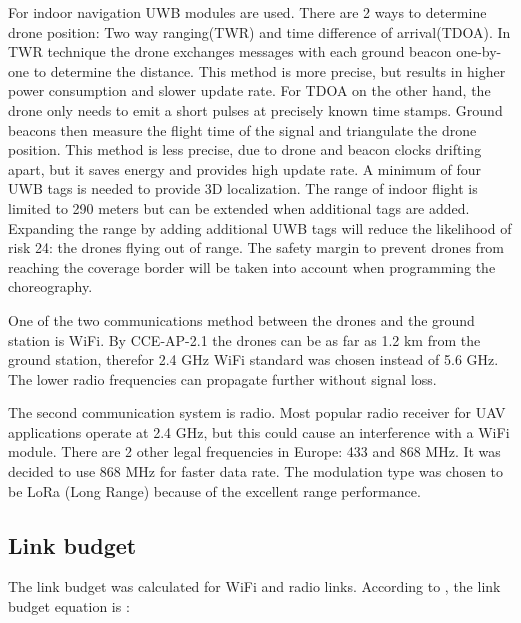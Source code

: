 For indoor navigation UWB modules are used. There are 2 ways to determine drone position: Two way ranging(TWR) and time difference of arrival(TDOA). In TWR technique the drone exchanges messages with each ground beacon one-by-one to determine the distance. This method is more precise, but results in higher power consumption and slower update rate. For TDOA on the other hand, the drone only needs to emit a short pulses at precisely known time stamps. Ground beacons then measure the flight time of the signal and triangulate the drone position. This method is less precise, due to drone and beacon clocks drifting apart, but it saves energy and provides high update rate. A minimum of four UWB tags is needed to provide 3D localization. The range of indoor flight is limited to 290 meters\cite{UWBrange} but can be extended when additional tags are added. Expanding the range by adding additional UWB tags will reduce the likelihood of risk 24: the drones flying out of range. The safety margin to prevent drones from reaching the coverage border will be taken into account when programming the choreography.

One of the two communications method between the drones and the ground station is WiFi. By CCE-AP-2.1 the drones can be as far as 1.2 km from the ground station, therefor 2.4 GHz WiFi standard was chosen instead of 5.6 GHz. The lower radio frequencies can propagate further without signal loss.

The second communication system is radio. Most popular radio receiver for UAV applications operate at 2.4 GHz, but this could cause an interference with a WiFi module. There are 2 other legal frequencies in Europe: 433 and 868 MHz. It was decided to use 868 MHz for faster data rate. The modulation type was chosen to be LoRa (Long Range)\cite{lora} because of the excellent range performance.  





\subsection{Link budget}
\label{subsec:cce_link_budget}

The link budget was calculated for WiFi and radio links. According to \cite{link_budget}, the link budget equation is :


